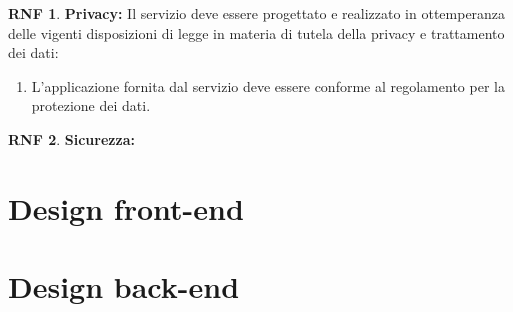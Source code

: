 \documentclass[11pt, a4paper]{article}
\theoremstyle{definition}
\newtheorem{nonfuncreq}{RNF} %
\begin{document}
\begin{nonfuncreq}
\textbf{Privacy:}
Il servizio deve essere progettato e realizzato in ottemperanza delle
vigenti disposizioni di legge in materia di tutela della privacy e
trattamento dei dati:
\begin{enumerate}
    \item L'applicazione fornita dal servizio deve essere conforme
    al regolamento \href{https://www.garanteprivacy.it/documents/10160/0/Regolamento+UE+2016+679.+Arricchito+con+riferimenti+ai+Considerando+Aggiornato+alle+rettifiche+pubblicate+sulla+Gazzetta+Ufficiale++dell%27Unione+europea+127+del+23+maggio+2018}{\textcolor{blue}{\underbar{UE n.2016/679}}} per
    la protezione dei dati.
\end{enumerate}
\end{nonfuncreq}

\begin{nonfuncreq}
\textbf{Sicurezza:}

\end{nonfuncreq}

\newpage
\section{Design front-end}

\section{Design back-end}
\end{document}
